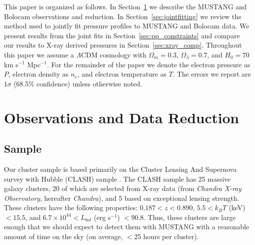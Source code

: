 \documentclass[iop,numberedappendix,apj]{emulateapj}
\begin{document}
This paper is organized as follows. In Section~\ref{sec:obs} we describe the MUSTANG and Bolocam observations and reduction. 
In Section~\ref{sec:jointfitting} we review the method used to jointly fit pressure profiles to MUSTANG and Bolocam data. We
present results from the joint fits in Section~\ref{sec:pp_constraints} and compare our results to X-ray derived pressures 
in Section~\ref{sec:xray_comp}. 
Throughout this paper we assume a $\Lambda$CDM cosmology with $\Omega_m = 0.3$, $\Omega_{\lambda} = 0.7$, and $H_0 = 70$ 
km s$^{-1}$ Mpc$^{-1}$. For the remainder of the paper we denote the electron pressure as $P$, electron density as $n_e$, 
and electron temperature as $T$. The errors we report are $1\sigma$ (68.5\% confidence) unless otherwise noted.

\section{Observations and Data Reduction}
\label{sec:obs}

\subsection{Sample}

Our cluster sample is based primarily on the Cluster Lensing And Supernova survey with Hubble (CLASH) sample
\citep{postman2012}.
The CLASH sample has 25 massive galaxy clusters, 20 of which are selected from X-ray data 
(from \emph{Chandra X-ray Observatory}, hereafter \emph{Chandra}), and 5 based on exceptional lensing strength. 
These clusters have the following properties: 
$0.187 < z < 0.890$, $5.5 < k_B T$ (keV)$ < 15.5$, and $6.7 \times 10^{44} < L_{bol}$ 
(erg s$^{-1}$) $<90.8$. Thus, these clusters are large enough that we should expect to detect 
them with MUSTANG with a reasonable 
amount of time on the sky (on average, $<$25 hours per cluster).

\end{document}
